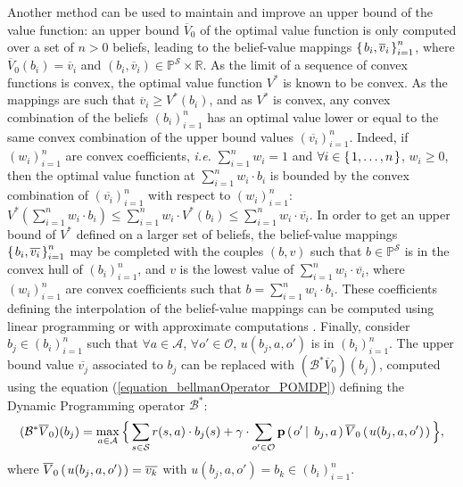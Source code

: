 Another method can be used to maintain and improve an upper bound 
of the value function: 
an upper bound $\overline{V}_0$ of the optimal value function is only
computed over a set of $n>0$ beliefs,
leading to the belief-value mappings 
$\left\{ \left.  b_i, \overline{v}_i  \right. \right\}_{i=1}^{n}$,
where $\overline{V}_0(b_i) = \overline{v}_i$
and $(b_i,\overline{v}_i) \in \mathbb{P}^{\mathcal{S}} \times \mathbb{R}$.
As the limit of a sequence of convex functions
is convex, the optimal value function $V^*$ is known to be convex.
As the mappings are such that $\overline{v}_i \geqslant V^*(b_i)$, 
and as $V^*$ is convex, any convex combination of the beliefs $(b_i)_{i=1}^n$
has an optimal value lower or equal to the same convex combination of the upper bound values $(\overline{v_i})_{i=1}^n$.
Indeed, if $(w_i)_{i=1}^n$ are convex coefficients, \textit{i.e.} 
$\sum_{i=1}^n w_i = 1$ and $\forall i \in \left\{ \left. 1,\ldots,n \right. \right\}$, $w_i\geqslant 0$,
then the optimal value function at $\sum_{i=1}^n w_i \cdot b_i$ 
is bounded by the convex combination of $(\overline{v_i})_{i=1}^n$
with respect to $(w_i)_{i=1}^n$: $V^*(\sum_{i=1}^n w_i \cdot b_i) \leqslant \sum_{i=1}^n w_i \cdot V^*(b_i) \leqslant \sum_{i=1}^n w_i \cdot \overline{v_i}$.
In order to get an upper bound of $V^*$ defined on a larger set of beliefs, 
the belief-value mappings $\left\{ \left.  b_i, \overline{v_i}  \right. \right\}_{i=1}^n$
may be completed with the couples $(b,v)$ such that
$b \in \mathbb{P}^{\mathcal{S}}$ is in the convex hull of $(b_i)_{i=1}^{n}$,
and $v$ is the lowest value of $\sum_{i=1}^n w_i \cdot \overline{v_i}$,
where $(w_i)_{i=1}^n$ are convex coefficients such that $b = \sum_{i=1}^n w_i \cdot b_i$.
These coefficients defining the interpolation of the belief-value mappings 
can be computed using linear programming
or with approximate computations 
\cite{DBLP:journals/corr/abs-1106-0234,conf/aips/PoupartKK11}.
Finally, consider $b_j \in (b_i)_{i=1}^n$ 
such that $\forall a \in \mathcal{A}$, $\forall o' \in \mathcal{O}$,
$u(b_j,a,o')$ is in $(b_i)_{i=1}^n$.
The upper bound value $\overline{v_j}$ associated to $b_j$ can be replaced with 
$(\mathcal{B}^* \overline{V}_0)(b_j)$, 
computed using the equation (\ref{equation_bellmanOperator_POMDP}) 
defining the Dynamic Programming operator $\mathcal{B}^*$:
\[ (\mathcal{B}^* \overline{V}_0)(b_j) = \max_{a \in \mathcal{A}} \Big\{ \sum_{s \in \mathcal{S}} r(s,a) \cdot b_j(s) + \gamma \cdot \sum_{o' \in \mathcal{O}} \textbf{p} \left( \left. o' \, \right| \left. \, b_j , a  \right. \right) \overline{V}_0 \left( \left.  u(b_j,a,o')   \right. \right) \Big\}, \]
where $\overline{V}_0 \left( \left.  u(b_j,a,o')   \right. \right) = \overline{v_k}$
with $u(b_j,a,o') = b_k \in (b_i)_{i=1}^n$.
